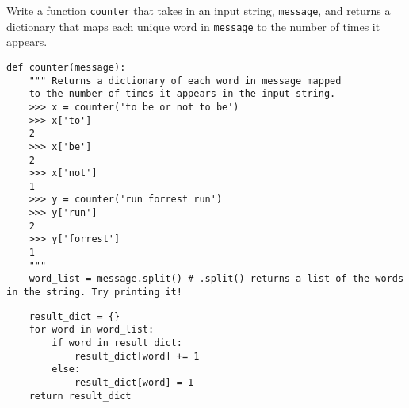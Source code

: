 \begin{blocksection}
    \question Write a function \texttt{counter} that takes in an input string, \texttt{message}, and 
    returns a dictionary that maps each unique word in \texttt{message} to the number of times it appears.
\end{blocksection}

\begin{blocksection}
\begin{lstlisting}
def counter(message):
    """ Returns a dictionary of each word in message mapped
    to the number of times it appears in the input string.
    >>> x = counter('to be or not to be')
    >>> x['to']
    2
    >>> x['be']
    2
    >>> x['not']
    1
    >>> y = counter('run forrest run')
    >>> y['run']
    2
    >>> y['forrest']
    1
    """
    word_list = message.split() # .split() returns a list of the words in the string. Try printing it!
    \end{lstlisting}
    \begin{solution}[1in]
    \begin{lstlisting}
    result_dict = {}
    for word in word_list:
        if word in result_dict:
            result_dict[word] += 1
        else:
            result_dict[word] = 1
    return result_dict
    \end{lstlisting}
    \end{solution}
\end{blocksection}